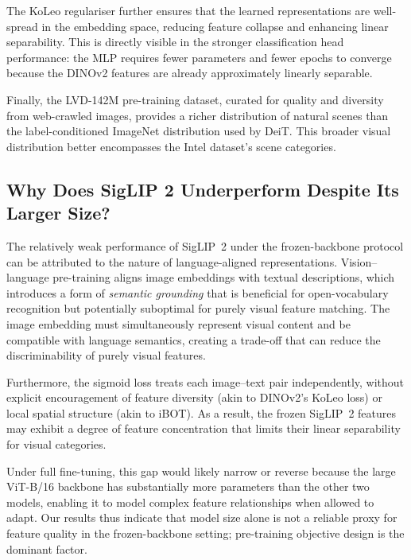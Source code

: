 \documentclass[journal]{IEEEtran}
\begin{document}
The KoLeo regulariser further ensures that the learned representations are well-spread
in the embedding space, reducing feature collapse and enhancing linear separability.
This is directly visible in the stronger classification head performance: the MLP
requires fewer parameters and fewer epochs to converge because the DINOv2 features are
already approximately linearly separable.

Finally, the LVD-142M pre-training dataset, curated for quality and diversity from
web-crawled images, provides a richer distribution of natural scenes than the label-conditioned
ImageNet distribution used by DeiT. This broader visual distribution better encompasses
the Intel dataset's scene categories.

\subsection{Why Does SigLIP 2 Underperform Despite Its Larger Size?}
The relatively weak performance of SigLIP~2 under the frozen-backbone protocol can be
attributed to the nature of language-aligned representations. Vision–language pre-training
aligns image embeddings with textual descriptions, which introduces a form of
\textit{semantic grounding} that is beneficial for open-vocabulary recognition but
potentially suboptimal for purely visual feature matching. The image embedding must
simultaneously represent visual content and be compatible with language semantics,
creating a trade-off that can reduce the discriminability of purely visual features.

Furthermore, the sigmoid loss treats each image–text pair independently, without explicit
encouragement of feature diversity (akin to DINOv2's KoLeo loss) or local spatial
structure (akin to iBOT). As a result, the frozen SigLIP~2 features may exhibit a
degree of feature concentration that limits their linear separability for visual categories.

Under full fine-tuning, this gap would likely narrow or reverse because the large
ViT-B/16 backbone has substantially more parameters than the other two models, enabling
it to model complex feature relationships when allowed to adapt. Our results thus indicate
that model size alone is not a reliable proxy for feature quality in the frozen-backbone
setting; pre-training objective design is the dominant factor.
\end{document}
